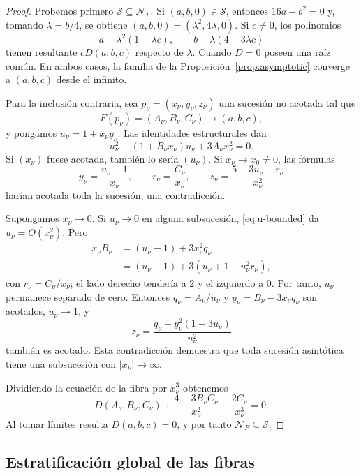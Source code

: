 \documentclass[11pt]{article}
\theoremstyle{definition}
\theoremstyle{remark}
\begin{document}
\begin{proof}
Probemos primero $\mathcal S\subseteq\mathcal N_F$. Si
$(a,b,0)\in\mathcal S$, entonces $16a-b^2=0$ y, tomando
$\lambda=b/4$, se obtiene $(a,b,0)=(\lambda^2,4\lambda,0)$. Si $c\neq0$, los
polinomios
\[
a-\lambda^2(1-\lambda c),
\qquad
b-\lambda(4-3\lambda c)
\]
tienen resultante $cD(a,b,c)$ respecto de $\lambda$. Cuando $D=0$ poseen una
ra\'iz com\'un. En ambos casos, la familia de la
Proposici\'on~\ref{prop:asymptotic} converge a $(a,b,c)$ desde el infinito.

Para la inclusi\'on contraria, sea
$p_\nu=(x_\nu,y_\nu,z_\nu)$ una sucesi\'on no acotada tal que
\[
F(p_\nu)=(A_\nu,B_\nu,C_\nu)\longrightarrow(a,b,c),
\]
y pongamos $u_\nu=1+x_\nu y_\nu$. Las identidades estructurales dan
\begin{equation}\label{eq:u-bounded}
u_\nu^2-(1+B_\nu x_\nu)u_\nu+3A_\nu x_\nu^2=0.
\end{equation}
Si $(x_\nu)$ fuese acotada, tambi\'en lo ser\'ia $(u_\nu)$. Si
$x_\nu\to x_0\neq0$, las f\'ormulas
\[
y_\nu=\frac{u_\nu-1}{x_\nu},\qquad
r_\nu=\frac{C_\nu}{x_\nu},\qquad
z_\nu=\frac{5-3u_\nu-r_\nu}{x_\nu^2}
\]
har\'ian acotada toda la sucesi\'on, una contradicci\'on.

Supongamos $x_\nu\to0$. Si $u_\nu\to0$ en alguna subsucesi\'on,
\eqref{eq:u-bounded} da $u_\nu=O(x_\nu^2)$. Pero
\begin{align*}
x_\nu B_\nu
&=(u_\nu-1)+3x_\nu^2q_\nu\\
&=(u_\nu-1)+3(u_\nu+1-u_\nu^2r_\nu),
\end{align*}
con $r_\nu=C_\nu/x_\nu$; el lado derecho tender\'ia a $2$ y el izquierdo a
$0$. Por tanto, $u_\nu$ permanece separado de cero. Entonces
$q_\nu=A_\nu/u_\nu$ y $y_\nu=B_\nu-3x_\nu q_\nu$ son acotados,
$u_\nu\to1$, y
\[
z_\nu=\frac{q_\nu-y_\nu^2(1+3u_\nu)}{u_\nu^2}
\]
tambi\'en es acotado. Esta contradicci\'on demuestra que toda sucesi\'on
asint\'otica tiene una subsucesi\'on con $|x_\nu|\to\infty$.

Dividiendo la ecuaci\'on de la fibra por $x_\nu^3$ obtenemos
\[
D(A_\nu,B_\nu,C_\nu)
+\frac{4-3B_\nu C_\nu}{x_\nu^2}
-\frac{2C_\nu}{x_\nu^3}=0.
\]
Al tomar l\'imites resulta $D(a,b,c)=0$, y por tanto
$\mathcal N_F\subseteq\mathcal S$.
\end{proof}

\subsection{Estratificaci\'on global de las fibras}
\end{document}
